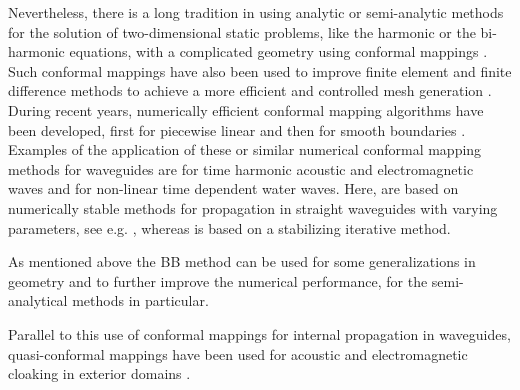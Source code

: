 \documentclass[numreferences]{kluwer}
\begin{document}
Nevertheless, there is a long tradition in using analytic or
semi-analytic methods for the solution of two-dimensional static
problems, like the harmonic or the bi-harmonic equations, with a
complicated geometry using conformal mappings
\cite{muskhelishvili:1962}. Such conformal mappings have also been
used to improve finite element and finite difference methods to
achieve a more efficient and controlled mesh generation
\cite{ives+liutermoza:1977}. During recent years, numerically
efficient conformal mapping algorithms have been developed, first for
piecewise linear \cite{sctoolbox} and then for smooth boundaries
\cite{andersson-outpol:2008,andersson-acf:2009}. Examples of the
application of these or similar numerical conformal mapping methods
for waveguides are \cite{Andersson:2006,Andersson-Nilsson:2009} for
time harmonic acoustic and electromagnetic waves and
\cite{nachbin+daSilvaSimoes:2012} for non-linear time dependent water
waves. Here, \cite{Andersson:2006,Andersson-Nilsson:2009} are based on
numerically stable methods for propagation in straight waveguides with
varying parameters, see e.g. \cite{Fishman:1998,Nilsson:2002}, whereas
\cite{nachbin+daSilvaSimoes:2012} is based on a stabilizing iterative
method.

As mentioned above the BB method can be used for some generalizations
in geometry and to further improve the numerical performance, for the
semi-analytical methods in particular.

Parallel to this use of conformal mappings for internal propagation in
waveguides, quasi-conformal mappings have been used for acoustic and
electromagnetic cloaking in exterior domains
\cite{pendryschurigsmith2006}.
\end{document}
